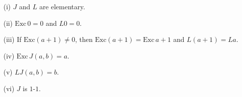 (i) $J$ and $L$ are elementary.

(ii) $\text{Exc}\,0 = 0$ and $L0 = 0$.

(iii) If $\text{Exc}(a + 1) \neq 0$, then $\text{Exc}(a + 1) = \text{Exc}\,a + 1$ and $L(a + 1) = La$.

(iv) $\text{Exc}\,J(a, b) = a$.

(v) $LJ(a, b) = b$.

(vi) $J$ is $1$-$1$.
